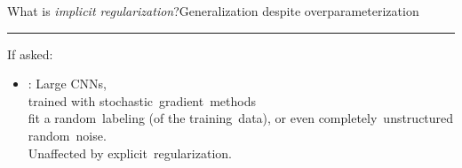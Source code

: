 \documentclass[handout,usenames,dvipsnames]{beamer} %
\begin{document}
\begin{frame}{What is \emph{implicit regularization}?}{Generalization despite overparameterization}
{        \vspace*{\fill}
        \noindent\rule{\textwidth}{1pt}
        \newline
        \alert{If asked:}
        \begin{itemize}
            \item \cite{zhang2017understanding}: Large CNNs,\\
            trained with stochastic~gradient~methods\\
            fit a random~labeling (of the training~data), or even completely~unstructured random~noise.\\
            Unaffected by explicit~regularization.
        \end{itemize}
    }
\end{frame}
\end{document}
